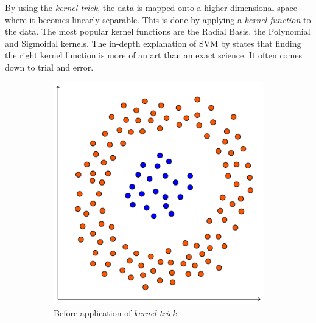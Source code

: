 By using the \textit{kernel trick}, the data is mapped onto a higher dimensional space where it becomes linearly separable. This is done by applying a \textit{kernel function} to the data. The most popular kernel functions are the Radial Basis, the Polynomial and Sigmoidal kernels. The in-depth explanation of SVM by \cite{Fletcher09} states that finding the right kernel function is more of an art than an exact science. It often comes down to trial and error. \\


\begin{figure}[t]
    \centering
    \begin{subfigure}[b]{0.45\textwidth}
        \includegraphics[width=\textwidth]{./figs/non_linearly_separable_classes}
        \caption{Before application of \textit{kernel trick}}
        \label{fig:non_linearly_separable_2d}
    \end{subfigure}
    \begin{subfigure}[b]{0.45\textwidth}

\end{subfigure}
\end{figure}
